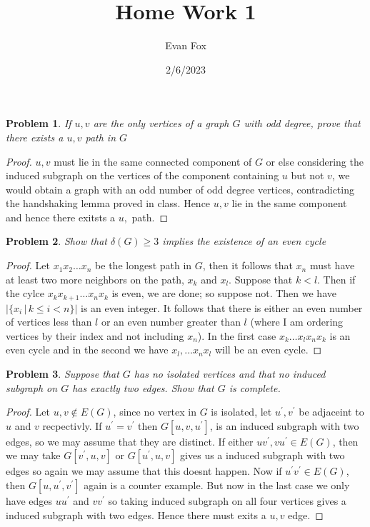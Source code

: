 \documentclass{article}
\title{Home Work 1}
\author{Evan Fox}
\date{2/6/2023}
\newtheorem{prb}{Problem}
\begin{document}
 

\maketitle
\begin{prb} 
If $u,v$ are the only vertices of a graph $G$ with odd degree, prove that there exists a $u,v$ path in $G$
\end{prb} 
\begin{proof} 
$u,v$ must lie in the same connected component of $G$ or else considering the induced subgraph on the vertices of the component containing $u$ but not $v$, we would obtain a graph with an odd number of odd degree vertices, contradicting the handshaking lemma proved in class. Hence $u,v$ lie in the same component and hence there exitsts a $u,$ path. 
\end{proof}

\begin{prb}
Show that $\delta(G) \geq 3$ implies the existence of an even cycle
\end{prb} 

\begin{proof} 
Let $x_1 x_2 \dots x_n$ be the longest path in $G$, then it follows that $x_n$ must have at least two more neighbors on the path, $x_k$ and $x_l$. 
Suppose that $k < l$. Then if the cylce $x_k x_{k+1} \dots x_n x_k$ is even, we are done; so suppose not. Then we have 
$|\{ x_i\, | \, k \leq i < n \}|$ is an even integer. It follows that there is either an even number of vertices less than $l$ or an even number 
greater than $l$ (where I am ordering vertices by their index and not including $x_n$). In the first case $x_k \dots x_l x_n x_k$ is an even cycle and 
in the second we have $x_l, \dots x_n x_l$ will be an even cycle.  
\end{proof}

\newpage

\begin{prb} 
Suppose that $G$ has no isolated vertices and that no induced subgraph on $G$ has exactly two edges. Show that $G$ is complete. 
\end{prb}

\begin{proof} 
	Let $u, v \notin E(G)$, since no vertex in $G$ is isolated, let $u^\prime, v^\prime$ be adjaceint to $u$ and $v$ recpectivly. If $u^\prime = v^\prime$ then $G[u, v, u^\prime]$, is an induced subgraph with two edges, so we may assume that they are distinct. If either $uv^\prime, vu^\prime \in E(G)$, then we may take $G[v^\prime, u, v]$ or $G[u^\prime, u, v]$ gives us a induced subgraph with two edges so again we may assume that this doesnt happen. Now if $u^\prime v^\prime \in E(G)$, then $G[u, u^\prime, v^\prime]$ again is a counter example. But now in the last case we only have edges $u u^\prime$ and $v v^\prime$ so taking induced subgraph on all four vertices gives a induced subgraph with two edges. Hence there must exits a $u, v$ edge.
\end{proof}
\newpage
\end{document}
